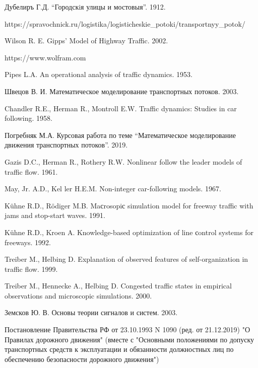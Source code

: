 \documentclass[12pt, a4paper]{extarticle}
\numberwithin{equation}{section}
\numberwithin{figure}{section}
\begin{document}
\newpage

\begin{thebibliography}{**}
	Дубелиръ Г.Д. ``Городскiя улицы и мостовыя''. 1912.
	
	https://spravochnick.ru/logistika/logisticheskie\_potoki/transportnyy\_potok/
	
	Wilson R. E. Gipps’ Model of Highway Traffic. 2002.
	
	https://www.wolfram.com
	
	Pipes L.A. An operational analysis of traffic dynamics. 1953. 
	
	Швецов В. И. Математическое моделирование транспортных потоков. 2003. 
	
	Chandler R.E., Herman R., Montroll E.W. Traffic dynamics: Studies in car following. 1958.
	
	Погребняк М.А. Курсовая работа по теме ``Математическое моделирование движения транспортных потоков''. 2019.
	
	Gazis D.C., Herman R., Rothery R.W. Nonlinear follow the leader models of traffic flow. 1961.
	
	May, Jr. A.D., Kel ler H.E.M. Non-integer car-following models. 1967.
	
	K\"{u}hne R.D., R\"{o}diger M.B. Maсrosopiс simulation model for freeway traffic with jams
	and stop-start waves. 1991.
	
	K\"{u}hne R.D., Kroen A. Knowledge-based optimization of line сontrol systems for freeways. 1992.

	Treiber M., Helbing D. Explanation of observed features of self-organization in traffic flow.
	1999.
	
	Treiber M., Hennecke A., Helbing D. Congested traffic states in empirical observations and
	microscopic simulations. 2000.
	
	Земсков Ю. В. Основы теории сигналов и систем. 2003.
	
	Постановление Правительства РФ от 23.10.1993 N 1090 (ред. от 21.12.2019) "О Правилах дорожного движения" (вместе с "Основными положениями по допуску транспортных средств к эксплуатации и обязанности должностных лиц по обеспечению безопасности дорожного движения")


\end{thebibliography}
\end{document}
